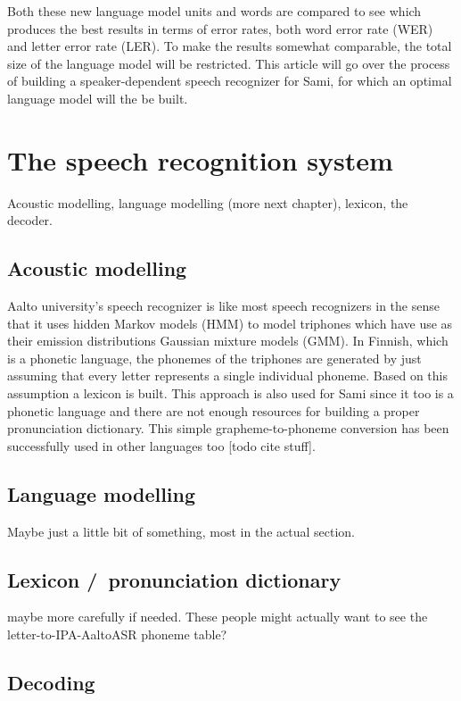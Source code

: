 \documentclass[10pt,b5paper]{article}
\begin{document}
Both these new language model units and words are compared to see which produces the best results in terms of error rates, both word error rate (WER) and letter error rate (LER). To make the results somewhat comparable, the total size of the language model will be restricted. This article will go over the process of building a speaker-dependent speech recognizer for Sami, for which an optimal language model will the be built.

\section{The speech recognition system}

Acoustic modelling, language modelling (more next chapter), lexicon, the decoder.


\subsection{Acoustic modelling}

Aalto university's speech recognizer is like most speech recognizers in the sense that it uses hidden Markov models (HMM) to model triphones which have use as their emission distributions Gaussian mixture models (GMM). In Finnish, which is a phonetic language, the phonemes of the triphones are generated by just assuming that every letter represents a single individual phoneme. Based on this assumption a lexicon is built. This approach is also used for Sami since it too is a phonetic language and there are not enough resources for building a proper pronunciation dictionary. This simple grapheme-to-phoneme conversion has been successfully used in other languages too [todo cite stuff].

\subsection{Language modelling}

Maybe just a little bit of something, most in the actual section.

\subsection{Lexicon /\ pronunciation dictionary}

maybe more carefully if needed. These people might actually want to see the letter-to-IPA-AaltoASR phoneme table?

\subsection{Decoding}
\end{document}
